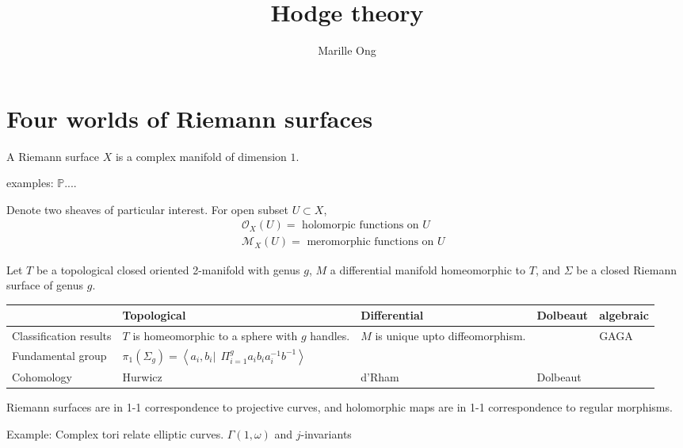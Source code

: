 % 


\title{Hodge theory}
\author{Marille Ong}
\date{}

 
\maketitle

\section{Four worlds of Riemann surfaces} %

\begin{definition}
  A Riemann surface $X$ is a complex manifold of dimension $1$.
\end{definition}

examples:
$ \mathbb{P} $.... 

Denote two sheaves of particular interest. 
For open subset $U \subset X $, 
\begin{align}
    \mathcal{O}_X ( U) =  \mbox{ holomorpic functions on $U$ } \\
    \mathcal{M}_X ( U) =  \mbox{ meromorphic functions on $U$ } 
\end{align}

Let $T$ be a topological closed oriented 2-manifold with genus $g$, $M$ a differential manifold homeomorphic to $T$, 
and $\Sigma $ be a closed Riemann surface of genus $g$. 

\begin{tabularx}{0.8\linewidth}{X|XXXX}
   &   Topological  & Differential & Dolbeaut & algebraic \\ \hline
    Classification results & 
    $T$ is homeomorphic to a sphere with $g$ handles.  & 
    $M$ is unique upto diffeomorphism. & & GAGA \\ 

    Fundamental group & 
    $\pi_1 ( \Sigma_g) = \left< a_i, b_i | ~~ \Pi_{i=1} ^g a_i b_i a_i^{-1} b^{-1} \right> $ & 
    \\
    Cohomology & 
    Hurwicz & 
    d'Rham & 
    Dolbeaut & 
    \\

\end{tabularx} 

Riemann surfaces are in 1-1 correspondence to projective curves, and holomorphic maps are in 1-1 correspondence to regular morphisms.

Example: Complex tori relate elliptic curves. 
$ \Gamma( 1, \omega) $  and $j$-invariants 

